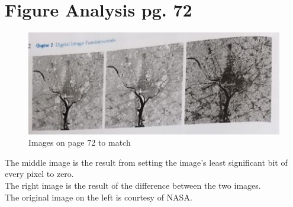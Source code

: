 \documentclass{article}
\begin{document}









\pagebreak

\section{Figure Analysis pg. 72}

\begin{figure}[h!]
\includegraphics[scale=1.25]{pg72.jpg}
\caption{Images on page 72 to match}
\end{figure}

\noindent
The middle image is the result from setting the image's least significant bit of every pixel to zero.\\
The right image is the result of the difference between the two images.\\
The original image on the left is courtesy of NASA.\\
\end{document}
